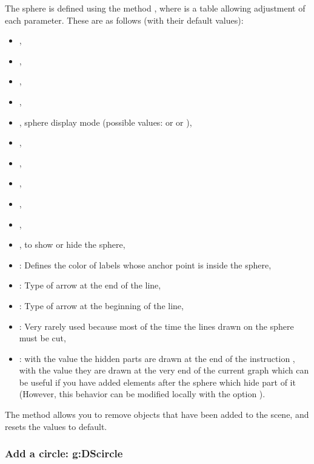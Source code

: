 The sphere is defined using the method , where  is a table allowing adjustment of each parameter. These are as follows (with their default values):
\begin{itemize}
    \item {},
    \item {},
    \item {},
    \item {},
    \item {}, sphere display mode (possible values:  or  or ),
    \item {},
    \item {},
    \item {},
    \item {},
    \item {},
    \item {}, to show or hide the sphere,
    \item {}: Defines the color of labels whose anchor point is inside the sphere,
    \item {}: Type of arrow at the end of the line,
    \item {}: Type of arrow at the beginning of the line,
    \item {}: Very rarely used because most of the time the lines drawn on the sphere must be cut,
    \item {}: with the value \false the hidden parts are drawn at the end of the instruction , with the value \true they are drawn at the very end of the current graph which can be useful if you have added elements after the sphere which hide part of it (However, this behavior can be modified locally with the option ).
\end{itemize}


The  method allows you to remove objects that have been added to the scene, and resets the values ​​to default.


\subsubsection{Add a circle: g:DScircle}
\def\writeoptions{The \argu{options} argument is a table whose fields define the options, which are (with their default value)}%

